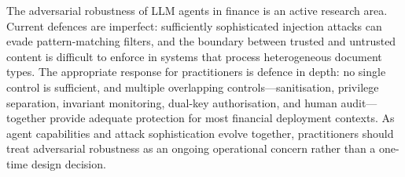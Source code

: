 \begin{context}
The adversarial robustness of LLM agents in finance is an active research area.
Current defences are imperfect: sufficiently sophisticated injection attacks can
evade pattern-matching filters, and the boundary between trusted and untrusted content
is difficult to enforce in systems that process heterogeneous document types. The
appropriate response for practitioners is defence in depth: no single control is
sufficient, and multiple overlapping controls---sanitisation, privilege separation,
invariant monitoring, dual-key authorisation, and human audit---together provide
adequate protection for most financial deployment contexts. As agent capabilities and
attack sophistication evolve together, practitioners should treat adversarial robustness
as an ongoing operational concern rather than a one-time design decision.

\end{context}

